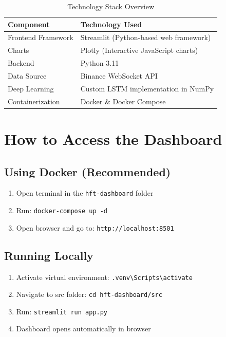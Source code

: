 \documentclass[12pt,a4paper]{article}
\begin{document}
\begin{table}[h]
\centering
\begin{tabular}{ll}
\toprule
\textbf{Component} & \textbf{Technology Used} \\
\midrule
Frontend Framework & Streamlit (Python-based web framework) \\
Charts & Plotly (Interactive JavaScript charts) \\
Backend & Python 3.11 \\
Data Source & Binance WebSocket API \\
Deep Learning & Custom LSTM implementation in NumPy \\
Containerization & Docker \& Docker Compose \\
\bottomrule
\end{tabular}
\caption{Technology Stack Overview}
\end{table}

\section{How to Access the Dashboard}

\subsection{Using Docker (Recommended)}
\begin{enumerate}
    \item Open terminal in the \texttt{hft-dashboard} folder
    \item Run: \texttt{docker-compose up -d}
    \item Open browser and go to: \texttt{http://localhost:8501}
\end{enumerate}

\subsection{Running Locally}
\begin{enumerate}
    \item Activate virtual environment: \texttt{.venv\textbackslash Scripts\textbackslash activate}
    \item Navigate to src folder: \texttt{cd hft-dashboard/src}
    \item Run: \texttt{streamlit run app.py}
    \item Dashboard opens automatically in browser
\end{enumerate}
\end{document}
